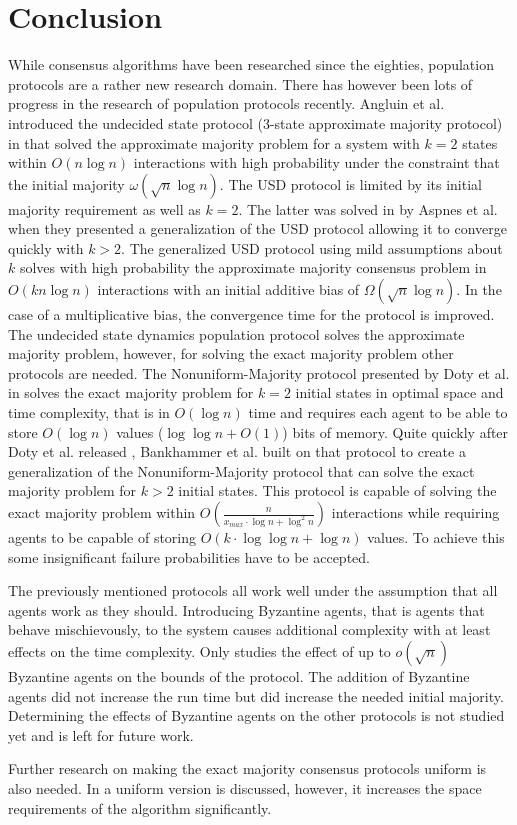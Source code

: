 \section{Conclusion} 
While consensus algorithms have been researched since the eighties, population protocols are a rather new research domain. There has however been lots of progress in the research of population protocols recently. Angluin et al. introduced the undecided state protocol (3-state approximate majority protocol) in \cite{angluinSimplePopulationProtocol2008} that solved the approximate majority problem for a system with $k = 2$ states within $O(n \log n)$ interactions with high probability under the constraint that the initial majority $\omega(\sqrt{n} \log n)$. The USD protocol is limited by its initial majority requirement as well as $k = 2$. The latter was solved in \cite{AspnesFastConverganceOfKOpinion2023} by Aspnes et al. when they presented a generalization of the USD protocol allowing it to converge quickly with $k > 2$. The generalized USD protocol using mild assumptions about $k$ solves with high probability the approximate majority consensus problem in $O(k n \log n)$ interactions with an initial additive bias of $\Omega(\sqrt{n} \log n)$. In the case of a multiplicative bias, the convergence time for the protocol is improved. The undecided state dynamics population protocol solves the approximate majority problem, however, for solving the exact majority problem other protocols are needed. The Nonuniform-Majority protocol presented by Doty et al. in \cite{dotyTimeSpaceOptimal2022} solves the exact majority problem for $k = 2$ initial states in optimal space and time complexity, that is in $O(\log n)$ time and requires each agent to be able to store $O(\log n)$ values ($\log \log n + O(1)$) bits of memory. Quite quickly after Doty et al. released \cite{dotyTimeSpaceOptimal2022}, Bankhammer et al. \cite{bankhamerPopulationProtocolsExact2022} built on that protocol to create a generalization of the Nonuniform-Majority protocol that can solve the exact majority problem for $k > 2$ initial states. This protocol is capable of solving the exact majority problem within $O(\frac{n}{x_{max} \cdot \log n + \log^2 n})$ interactions while requiring agents to be capable of storing $O(k \cdot \log \log n + \log n)$ values. To achieve this some insignificant failure probabilities have to be accepted.

 The previously mentioned protocols all work well under the assumption that all agents work as they should. Introducing Byzantine agents, that is agents that behave mischievously, to the system causes additional complexity with at least effects on the time complexity. Only \cite{angluinSimplePopulationProtocol2008} studies the effect of up to $o(\sqrt{n})$ Byzantine agents on the bounds of the protocol. The addition of Byzantine agents did not increase the run time but did increase the needed initial majority. Determining the effects of Byzantine agents on the other protocols is not studied yet and is left for future work. 

Further research on making the exact majority consensus protocols uniform is also needed. In \cite{dotyTimeSpaceOptimal2022} a uniform version is discussed, however, it increases the space requirements of the algorithm significantly. 
